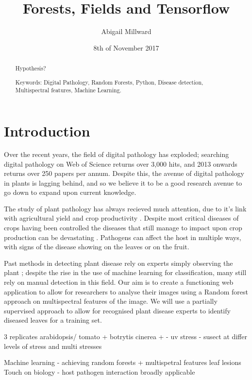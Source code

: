 \documentclass[a4paper]{article}
\title{Forests, Fields and Tensorflow}
\author{Abigail Millward}
\date{8th of November 2017}
\begin{document}

  \maketitle
    
  \begin{abstract}
    Hypothesis?
    
    Keywords: Digital Pathology, Random Forests, Python, Disease detection,
    Multispectral features, Machine Learning.
  \end{abstract}
  
  \section{Introduction}
    Over the recent years, the field of digital pathology has exploded; searching
    digital pathology on Web of Science returns over 3,000 hits, and 2013 onwards
    returns over 250 papers per annum. Despite this, the avenue of digital pathology
    in plants is lagging behind, and so we believe it to be a good research avenue
    to go down to expand upon current knowledge.
    
    The study of plant pathology has always recieved much attention, due to it's link with
    agricultural yield and crop productivity \cite{donatelli_modelling_2017, waller_the_2005}. 
    Despite most critical diseases of crops having been controlled \cite{wood_sustainable_1993}
    the diseases that still manage to impact upon crop production can be devastating 
    \cite{woodham-smith_the_1962, mccook_global_2006}. Pathogens can affect the host in multiple 
    ways, with signs of the disease showing on the leaves or on the fruit.

    Past methods in detecting plant disease rely on experts simply observing the plant
    \cite{singh_detection_2017}; despite the rise in the use of machine learning for classification,
    many still rely on manual detection in this field. Our aim is to create a functioning web application
    to allow for researchers to analyse their images using a Random forest approach on
    multispectral features of the image. We will use a partially supervised approach 
    to allow for recognised plant disease experts to identify diseased leaves for a training
    set. 
    
 
3 replicates 
arabidopsis/ tomato + botrytis cinerea   + - uv stress - susect at differ levels of stress and multi stresses

Machine learning - achieving random forests + multispetral features 
leaf lesions
Touch on biology - host pathogen interaction
broadly applicable
\end{document}
